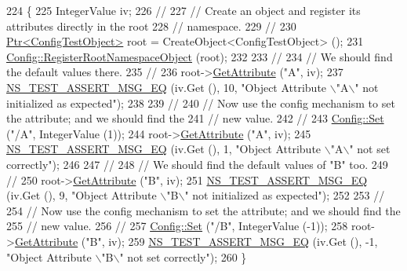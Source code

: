 \begin{DoxyCode}
224 \{
225   IntegerValue iv;
226   \textcolor{comment}{//}
227   \textcolor{comment}{// Create an object and register its attributes directly in the root }
228   \textcolor{comment}{// namespace.}
229   \textcolor{comment}{//}
230   \hyperlink{classns3_1_1Ptr}{Ptr<ConfigTestObject>} root = CreateObject<ConfigTestObject> ();
231   \hyperlink{group__config_gadf663c596f54bed678e83cccd4e3d9d5}{Config::RegisterRootNamespaceObject} (root);
232 
233   \textcolor{comment}{//}
234   \textcolor{comment}{// We should find the default values there.}
235   \textcolor{comment}{//}
236   root->\hyperlink{classns3_1_1ObjectBase_a895d1de2f96063d0e0fd78463e7a7e30}{GetAttribute} (\textcolor{stringliteral}{"A"}, iv);
237   \hyperlink{group__testing_ga2a9d78cffb3db8e867c35fff0b698cf5}{NS\_TEST\_ASSERT\_MSG\_EQ} (iv.Get (), 10, \textcolor{stringliteral}{"Object Attribute \(\backslash\)"A\(\backslash\)" not initialized as
       expected"});
238 
239   \textcolor{comment}{//}
240   \textcolor{comment}{// Now use the config mechanism to set the attribute; and we should find the}
241   \textcolor{comment}{// new value.}
242   \textcolor{comment}{//}
243   \hyperlink{group__config_gadce03667ec621d64ce4aace85d9bcfd0}{Config::Set} (\textcolor{stringliteral}{"/A"}, IntegerValue (1));
244   root->\hyperlink{classns3_1_1ObjectBase_a895d1de2f96063d0e0fd78463e7a7e30}{GetAttribute} (\textcolor{stringliteral}{"A"}, iv);
245   \hyperlink{group__testing_ga2a9d78cffb3db8e867c35fff0b698cf5}{NS\_TEST\_ASSERT\_MSG\_EQ} (iv.Get (), 1, \textcolor{stringliteral}{"Object Attribute \(\backslash\)"A\(\backslash\)" not set correctly"});
246 
247   \textcolor{comment}{//}
248   \textcolor{comment}{// We should find the default values of "B" too.}
249   \textcolor{comment}{//}
250   root->\hyperlink{classns3_1_1ObjectBase_a895d1de2f96063d0e0fd78463e7a7e30}{GetAttribute} (\textcolor{stringliteral}{"B"}, iv);
251   \hyperlink{group__testing_ga2a9d78cffb3db8e867c35fff0b698cf5}{NS\_TEST\_ASSERT\_MSG\_EQ} (iv.Get (), 9, \textcolor{stringliteral}{"Object Attribute \(\backslash\)"B\(\backslash\)" not initialized as
       expected"});
252 
253   \textcolor{comment}{//}
254   \textcolor{comment}{// Now use the config mechanism to set the attribute; and we should find the}
255   \textcolor{comment}{// new value.}
256   \textcolor{comment}{//}
257   \hyperlink{group__config_gadce03667ec621d64ce4aace85d9bcfd0}{Config::Set} (\textcolor{stringliteral}{"/B"}, IntegerValue (-1));
258   root->\hyperlink{classns3_1_1ObjectBase_a895d1de2f96063d0e0fd78463e7a7e30}{GetAttribute} (\textcolor{stringliteral}{"B"}, iv);
259   \hyperlink{group__testing_ga2a9d78cffb3db8e867c35fff0b698cf5}{NS\_TEST\_ASSERT\_MSG\_EQ} (iv.Get (), -1, \textcolor{stringliteral}{"Object Attribute \(\backslash\)"B\(\backslash\)" not set correctly"});
260 \}
\end{DoxyCode}


